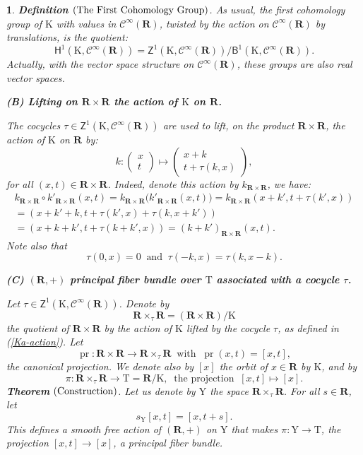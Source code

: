 \documentclass[10pt,letterpaper,reqno]{amsart}
\theoremstyle{article}
\newtheorem{article}[subsection]{}
\newenvironment{definition}[1][]{\textbf{Definition} $\left(\hbox{#1}\right)$.\it}{}
\newenvironment{theorem}[1][]{\textbf{Theorem} $\left(\hbox{#1}\right)$.\it}{}
\newcommand{\1}{{\hat 1}}
\newcommand{\0}{{\hat 0}}
\newcommand{\RR}{\mathbf R}
\newcommand{\sfbZ}{{\boldsymbol{\mathsf Z}}}
\newcommand{\sfbB}{{\boldsymbol{\mathsf B}}}
\newcommand{\sfbH}{{\boldsymbol{\mathsf H}}}
\def \K{\mathrm K}
\def \T{\mathrm T}
\def \Y{\mathrm Y}
\newcommand{\cl}[1]{\left[ #1 \right]}
\newcommand{\Cinfty}{\mathcal{C}^\infty}
\newcommand{\Ka}{\K}
\newcommand{\pr}{\operatorname{pr}}
\newcommand{\vect}[1]{\begin{pmatrix} #1 \end{pmatrix} }
\begin{document}
\begin{article}
    \begin{definition}[The First Cohomology Group]
      As usual,
      the first cohomology group of $\Ka$ with values in $\Cinfty(\RR)$,
      twisted by the action on $\Cinfty(\RR)$ by translations,
      is the quotient:
      $$
        \text{$\sfbH^1(\Ka,\Cinfty(\RR))$} = \text{$\sfbZ^1(\Ka,\Cinfty(\RR))$} / \text{$\sfbB^1(\Ka,\Cinfty(\RR))$}.
        $$
      Actually,
      with the vector space structure on $\Cinfty(\RR)$,
      these groups are also real vector spaces.
    \end{definition}
    
    \textbf{(B) Lifting on $\RR \times \RR$ the action of $\Ka$ on $\RR$.}
    
    The cocycles $\tau \in \sfbZ^1(\Ka,\Cinfty(\RR))$ are used to lift,
    on the product $\RR \times \RR$,
    the action of $\Ka$ on $\RR$ by:
    \begin{equation} \tag{E} %
      \label{Ka-action}
      k: \vect{x \\ t} \mapsto \vect{ x+k \\ t + \tau(k,x)},
    \end{equation}
    for all $(x,t) \in \RR \times \RR$.
    Indeed,
    denote this action by $k_{\RR \times \RR}$,
    we have:
    \begin{multline*}
      k_{\RR \times \RR} \circ k'_{\RR \times \RR} (x,t)
      = k_{\RR \times \RR}\big(k'_{\RR \times \RR} (x,t)\big)
      = k_{\RR \times \RR}(x+k', t+\tau(k',x)) \\
      = (x + k' + k, t+\tau(k',x) +\tau(k,x+k')) \\
      = (x + k + k', t + \tau(k+k',x))
      = (k+k')_{\RR \times \RR}(x,t).
    \end{multline*}
    Note also that
    $$
      \tau(0,x) = 0
      \ \text{ and } \
      \tau(-k,x) = \tau(k,x-k).
      $$
    
    \textbf{(C) $(\RR,+)$ principal fiber bundle over $\T$ associated with a cocycle $\tau$.}
    
    Let $\tau \in \sfbZ^1(\Ka,\Cinfty(\RR))$.
    Denote by
    $$
      \RR \times_\tau \RR = (\RR \times \RR)/\Ka
      $$
    the quotient of $\RR \times \RR$ by the action of $\Ka$ lifted by the cocycle $\tau$,
    as defined in (\ref{Ka-action}).
    Let
    $$
      \pr : \RR \times \RR \to \RR \times_\tau \RR
      \ \text{ with } \
      \pr(x,t) = \cl{x,t},
      $$
    the canonical projection.
    We denote also by $\cl{x}$ the orbit of $x \in \RR$ by $\Ka$,
    and by
    $$
      \pi : \RR \times_\tau \RR \to \T = \RR/\Ka,
      \ \text{ the projection } \
      \cl{x,t} \mapsto \cl{x}.
      $$
    \begin{theorem}[Construction]
      Let us denote by $\Y$ the space $\RR \times_\tau \RR$.
      For all $s \in \RR$,
      let
      $$
        s_{\Y}[x,t] = [x,t +s].
        $$
      This defines a smooth free action of $(\RR,+)$ on $\Y$ that makes $\pi : \Y \to \T$,
      the projection $\cl{x,t} \to \cl{x}$,
      a principal fiber bundle.
    \end{theorem}
    

\end{article}
\end{document}
